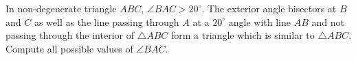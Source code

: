 In non-degenerate triangle $ABC$, $\angle{BAC}>20^\circ$. The exterior angle bisectors at $B$ and $C$ as well as the line passing through $A$ at a $20^\circ$ angle with line $AB$ and not passing through the interior of $\triangle{ABC}$ form a triangle which is similar to $\triangle{ABC}$. Compute all possible values of $\angle{BAC}$.